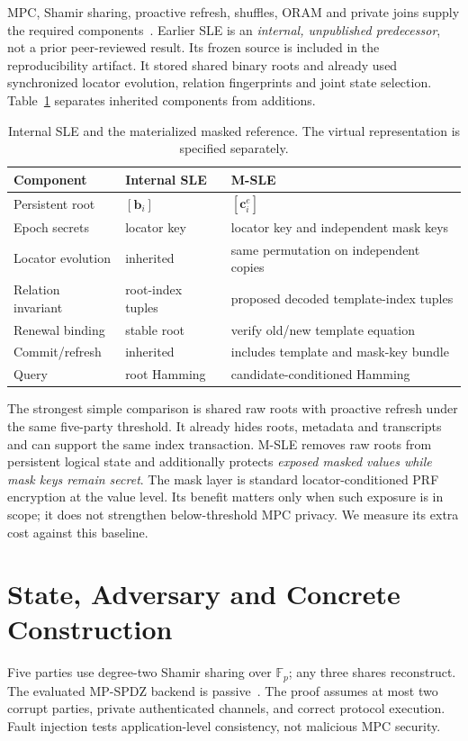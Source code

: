 \documentclass[journal]{IEEEtran}
\newcommand{\MSLE}{\textsc{M-SLE}\xspace}
\begin{document}
MPC, Shamir sharing, proactive refresh, shuffles, ORAM and private joins supply the required components~\cite{shamir1979share,keller2020mpspdz,herzberg1995proactive,stefanov2013pathoram,mohassel2020joins}. Earlier SLE is an \emph{internal, unpublished predecessor}, not a prior peer-reviewed result. Its frozen source is included in the reproducibility artifact. It stored shared binary roots and already used synchronized locator evolution, relation fingerprints and joint state selection. Table~\ref{tab:extension} separates inherited components from additions.
\begin{table}[t]
\caption{Internal SLE and the materialized masked reference. The virtual representation is specified separately.}
\label{tab:extension}\centering\small
\begin{tabularx}{\columnwidth}{p{}XX}
\toprule Component & Internal SLE & \MSLE \\
\midrule Persistent root & $[\mathbf b_i]$ & $[\mathbf c_i^e]$ \\
Epoch secrets & locator key & locator key and independent mask keys \\
Locator evolution & inherited & same permutation on independent copies \\
Relation invariant & root-index tuples & proposed decoded template-index tuples \\
Renewal binding & stable root & verify old/new template equation \\
Commit/refresh & inherited & includes template and mask-key bundle \\
Query & root Hamming & candidate-conditioned Hamming \\
\bottomrule
\end{tabularx}
\end{table}

The strongest simple comparison is shared raw roots with proactive refresh under the same five-party threshold. It already hides roots, metadata and transcripts and can support the same index transaction. \MSLE removes raw roots from persistent logical state and additionally protects \emph{exposed masked values while mask keys remain secret}. The mask layer is standard locator-conditioned PRF encryption at the value level. Its benefit matters only when such exposure is in scope; it does not strengthen below-threshold MPC privacy. We measure its extra cost against this baseline.

\section{State, Adversary and Concrete Construction}
Five parties use degree-two Shamir sharing over $\mathbb F_p$; any three shares reconstruct. The evaluated MP-SPDZ backend is passive~\cite{keller2020mpspdz}. The proof assumes at most two corrupt parties, private authenticated channels, and correct protocol execution. Fault injection tests application-level consistency, not malicious MPC security.
\end{document}
